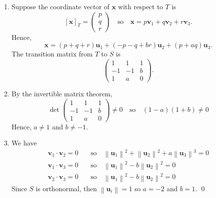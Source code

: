 \documentclass[12pt]{article}
\begin{document}
\begin{enumerate}[label=\textbf{(\alph*)}]
    \itemsep 0em
    \item Suppose the coordinate vector of $\mathbf{x}$ with respect to $T$ is \[\left[\mathbf{x}\right]_T=\begin{pmatrix}
        p\\q\\r
    \end{pmatrix}\quad\text{so}\quad \mathbf{x}=p\mathbf{v}_1+q\mathbf{v}_2+r\mathbf{v}_3.\]
    Hence, \[\mathbf{x}=\left(p+q+r\right)\mathbf{u}_1+\left(-p-q+br\right)\mathbf{u}_2+\left(p+aq\right)\mathbf{u}_3.\]
    The transition matrix from $T$ to $S$ is \[\begin{pmatrix}
        1&1&1 \\ -1&-1&b \\ 1&a&0
    \end{pmatrix}.\]
    \item By the invertible matrix theorem, \[\operatorname{det}\begin{pmatrix}
        1&1&1 \\ -1&-1&b \\ 1&a&0
    \end{pmatrix}\ne 0\quad\text{so}\quad \left(1-a\right)\left(1+b\right)\ne 0\]
    Hence, $a\ne 1$ and $b\ne -1$.
    \item We have \begin{align*}
        \mathbf{v}_1\cdot\mathbf{v}_2=0\quad&\text{so}\quad \left\|\mathbf{u}_1\right\|^2+\left\|\mathbf{u}_2\right\|^2+a\left\|\mathbf{u}_3\right\|^3=0 \\
        \mathbf{v}_1\cdot\mathbf{v}_3=0\quad&\text{so}\quad \left\|\mathbf{u}_1\right\|^2-b\left\|\mathbf{u}_2\right\|^2=0\\
        \mathbf{v}_2\cdot \mathbf{v}_3=0\quad&\text{so}\quad \left\|\mathbf{u}_1\right\|^2-b\left\|\mathbf{u}_2\right\|^2=0
    \end{align*}
    Since $S$ is orthonormal, then $\left\|\mathbf{u}_i\right\|=1$ so $a=-2$ and $b=1$. \qed 
\end{enumerate}
\newpage
\end{document}
